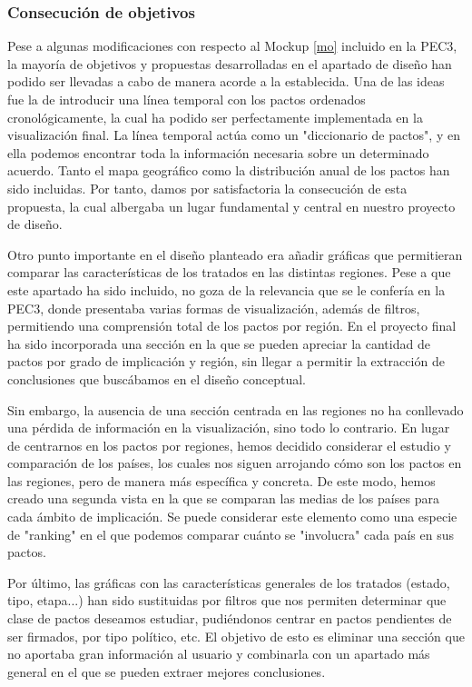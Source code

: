 \documentclass[11pt]{article}
\begin{document}
\subsubsection{Consecución de objetivos}

Pese a algunas modificaciones con respecto al Mockup \ref{mo} incluido en la PEC3, la mayoría de objetivos y propuestas desarrolladas en el apartado de diseño han podido ser llevadas a cabo de manera acorde a la establecida. Una de las ideas fue la de introducir una línea temporal con los pactos ordenados cronológicamente, la cual ha podido ser perfectamente implementada en la visualización final. La línea temporal actúa como un "diccionario de pactos", y en ella podemos encontrar toda la información necesaria sobre un determinado acuerdo. Tanto el mapa geográfico como la distribución anual de los pactos han sido incluidas. Por tanto, damos por satisfactoria la consecución de esta propuesta, la cual albergaba un lugar fundamental y central en nuestro proyecto de diseño.

Otro punto importante en el diseño planteado era añadir gráficas que permitieran comparar las características de los tratados en las distintas regiones. Pese a que este apartado ha sido incluido, no goza de la relevancia que se le confería en la PEC3, donde presentaba varias formas de visualización, además de filtros, permitiendo una comprensión total de los pactos por región. En el proyecto final ha sido incorporada una sección en la que se pueden apreciar la cantidad de pactos por grado de implicación y región, sin llegar a permitir la extracción de conclusiones que buscábamos en el diseño conceptual.

Sin embargo, la ausencia de una sección centrada en las regiones no ha conllevado una pérdida de información en la visualización, sino todo lo contrario. En lugar de centrarnos en los pactos por regiones, hemos decidido considerar el estudio y comparación de los países, los cuales nos siguen arrojando cómo son los pactos en las regiones, pero de manera más específica y concreta. De este modo, hemos creado una segunda vista en la que se comparan las medias de los países para cada ámbito de implicación. Se puede considerar este elemento como una especie de "ranking" en el que podemos comparar cuánto se "involucra" cada país en sus pactos.

Por último, las gráficas con las características generales de los tratados (estado, tipo, etapa...) han sido sustituidas por filtros que nos permiten determinar que clase de pactos deseamos estudiar, pudiéndonos centrar en pactos pendientes de ser firmados, por tipo político, etc. El objetivo de esto es eliminar una sección que no aportaba gran información al usuario y combinarla con un apartado más general en el que se pueden extraer mejores conclusiones.
\end{document}
